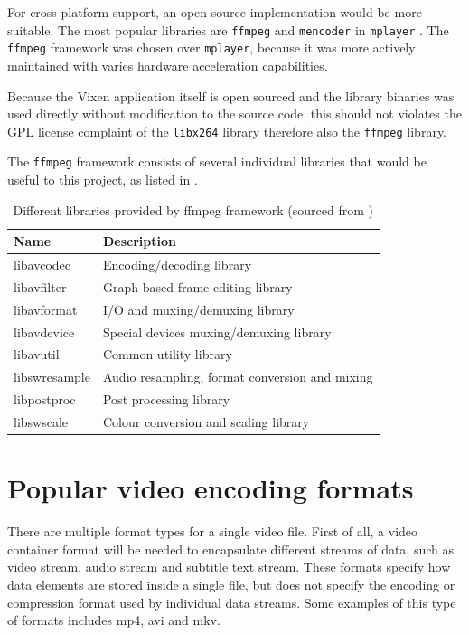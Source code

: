 For cross-platform support, an open source implementation would be more suitable. The most popular libraries are \texttt{ffmpeg} \cite{ffmpeg} and \texttt{mencoder} in \texttt{mplayer} \cite{mplayer}. The \texttt{ffmpeg} framework was chosen over \texttt{mplayer}, because it was more actively maintained with varies hardware acceleration capabilities.

Because the Vixen application itself is open sourced and the library binaries was used directly without modification to the source code, this should not violates the GPL license complaint of the \texttt{libx264} library therefore also the \texttt{ffmpeg} library.

The \texttt{ffmpeg} framework consists of several individual libraries that would be useful to this project, as listed in .

\begin{table}[t]
  \centering
  \begin{tabular}{l|l}
    \hline
    \textbf{Name} & \textbf{Description} \\
    \hline
    libavcodec & Encoding/decoding library  \\ \hline
    libavfilter & Graph-based frame editing library \\ \hline
    libavformat & I/O and muxing/demuxing library   \\ \hline
    libavdevice & Special devices muxing/demuxing library \\ \hline
    libavutil & Common utility library    \\ \hline
    libswresample & Audio resampling, format conversion and mixing  \\ \hline
    libpostproc & Post processing library \\ \hline
    libswscale & Colour conversion and scaling library  \\ \hline
  \end{tabular}
  \caption{\footnotesize Different libraries provided by ffmpeg framework (sourced from \cite{ffmpeg})}
  \label{tbl:ffmpeg}
\end{table}

\section{Popular video encoding formats}

There are multiple format types for a single video file. First of all, a video container format will be needed to encapsulate different streams of data, such as video stream, audio stream and subtitle text stream. These formats specify how data elements are stored inside a single file, but does not specify the encoding or compression format used by individual data streams. Some examples of this type of formats includes mp4, avi and mkv.

